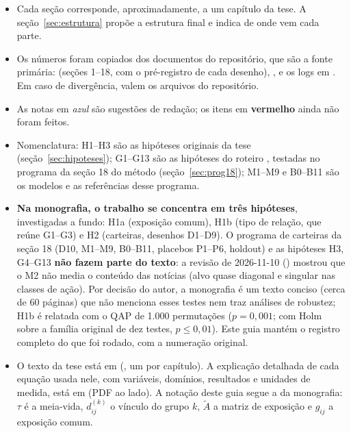 \documentclass[11pt,a4paper]{article}
\begin{document}
\begin{itemize}
  \item Cada seção corresponde, aproximadamente, a um capítulo da tese. A seção~\ref{sec:estrutura}
        propõe a estrutura final e indica de onde vem cada parte.
  \item Os números foram copiados dos documentos do repositório, que são a fonte primária:
         (seções 1--18, com o pré-registro de cada desenho),
        ,  e os logs em . Em caso de
        divergência, valem os arquivos do repositório.
  \item As notas em \textcolor{blue!60!black}{\textit{azul}} são sugestões de redação; os itens em \textcolor{red!70!black}{\textbf{vermelho}} ainda não foram feitos.
  \item Nomenclatura: H1--H3 são as hipóteses originais da tese (seção~\ref{sec:hipoteses}); G1--G13 são as
        hipóteses do roteiro , testadas no programa da seção 18
        do método (seção~\ref{sec:prog18}); M1--M9 e B0--B11 são os modelos e as referências desse programa.
  \item \textbf{Na monografia, o trabalho se concentra em três hipóteses}, investigadas a fundo:
        H1a (exposição comum), H1b (tipo de relação, que reúne G1--G3) e H2 (carteiras, desenhos D1--D9).
        O programa de carteiras da seção 18 (D10, M1--M9, B0--B11, placebos P1--P6, holdout) e as hipóteses
        H3, G4--G13 \textbf{não fazem parte do texto}: a revisão de 2026-11-10
        () mostrou que o M2 não media o conteúdo das notícias (alvo quase
        diagonal e singular nas classes de ação). Por decisão do autor, a monografia é um texto conciso (cerca
        de 60 páginas) que não menciona esses testes nem traz análises de robustez; H1b é relatada com o QAP
        de 1.000 permutações ($p=0{,}001$; com Holm sobre a família original de dez testes, $p\le0{,}01$).
        Este guia mantém o registro completo do que foi rodado, com a numeração original.
  \item O texto da tese está em  (, um  por capítulo).
        A explicação detalhada de cada equação usada nele, com variáveis, domínios, resultados e
        unidades de medida, está em  (PDF ao lado). A notação deste guia
        segue a da monografia: $\tau$ é a meia-vida, $d^{(k)}_{ij}$ o vínculo do grupo $k$, $\tilde A$ a matriz
        de exposição e $g_{ij}$ a exposição comum.
\end{itemize}
\end{document}
